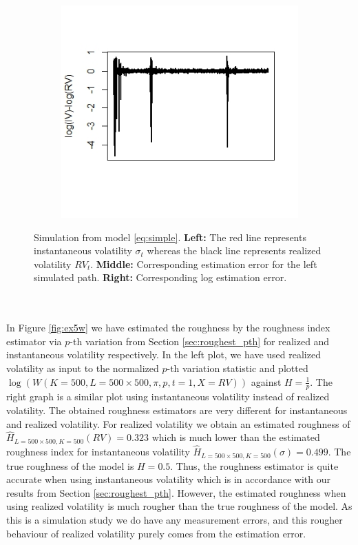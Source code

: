 \documentclass{article}
\begin{document}
\begin{figure}[h]
\begin{subfigure}{0.32\textwidth}
    \end{subfigure}\hfill
    \begin{subfigure}{0.32\textwidth}
        \centering
        \includegraphics[width=\textwidth]{ex5_IVRV3.jpeg}
    \end{subfigure}
    \caption{Simulation from model \eqref{eq:simple}. \textbf{Left:} The red line represents instantaneous volatility $\sigma_t$ whereas the black line represents realized volatility $RV_t$. \textbf{Middle:} Corresponding estimation error for the left simulated path. \textbf{Right:} Corresponding log estimation error.}
    \label{fig:ex5IVRV}
\end{figure}\\\\
In Figure \ref{fig:ex5w} we have estimated the roughness by the roughness index estimator via $p$-th variation from Section \ref{sec:roughest_pth} for realized and instantaneous volatility respectively. In the left plot, we have used realized volatility as input to the normalized $p$-th variation statistic and plotted $\log(W(K=500, L= 500\times 500, \pi, p, t=1, X = RV))$ against $H=\frac{1}{p}$. The right graph is a similar plot using instantaneous volatility instead of realized volatility. The obtained roughness estimators are very different for instantaneous and realized volatility. For realized volatility we obtain an estimated roughness of $\hat{H}_{L=500\times 500, K=500}(RV)=0.323$ which is much lower than the estimated roughness index for instantaneous volatility $\hat{H}_{L=500\times 500, K=500}(\sigma)=0.499$. The true roughness of the model is $H=0.5$. Thus, the roughness estimator is quite accurate when using instantaneous volatility which is in accordance with our results from Section \ref{sec:roughest_pth}. However, the estimated roughness when using realized volatility is much rougher than the true roughness of the model. As this is a simulation study we do have any measurement errors, and this rougher behaviour of realized volatility purely comes from the estimation error.
\end{document}
